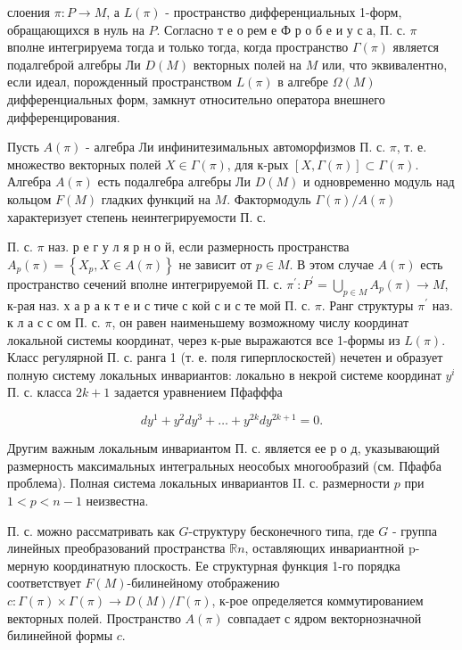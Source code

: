 \documentclass[10pt]{article}
\begin{document}
слоения $\pi: P \rightarrow M$, а $L(\pi)$ - пространство дифференциальных 1-форм, обращающихся в нуль на $P$. Согласно т е о рем е Ф р о б е и у с а, П. с. $\pi$ вполне интегрируема тогда и только тогда, когда пространство $\Gamma(\pi)$ является подалгеброй алгебры Ли $D(M)$ векторных полей на $M$ или, что эквивалентно, если идеал, порожденный пространством $L(\pi)$ в алгебре $\Omega(M)$ дифференциальных форм, замкнут относительно оператора внешнего дифференцирования.



Пусть $A(\pi)$ - алгебра Ли инфинитезимальных автоморфизмов П. с. $\pi$, т. е. множество векторных полей $X \in \Gamma(\pi)$, для к-рых $[X, \Gamma(\pi)] \subset \Gamma(\pi)$. Алгебра $A(\pi)$ есть подалгебра алгебры Ли $D(M)$ и одновременно модуль над кольцом $F(M)$ гладких функций на $M$. Фактормодуль $\Gamma(\pi) / A(\pi)$ характеризует степень неинтегрируемости П. с.



П. с. $\pi$ наз. р е г у л я р н о й, если размерность пространства $A_{p}(\pi)=\left\{X_{p}, X \in A(\pi)\right\}$ не зависит от $p \in M$. В этом случае $A(\pi)$ есть пространство сечений вполне интегрируемой П. с. $\pi^{\prime}: P^{\prime}=\bigcup_{p \in M} A_{p}(\pi) \rightarrow M$, к-рая наз. х а р а к т е и с тиче с кой с и с те мой П. с. $\pi$. Ранг структуры $\pi^{\prime}$ наз. к л а с с ом П. с. $\pi$, он равен наименьшему возможному числу координат локальной системы координат, через к-рые выражаются все 1-формы из $L(\pi)$. Класс регулярной П. с. ранга 1 (т. е. поля гиперплоскостей) нечетен и образует полную систему локальных инвариантов: локально в некрой системе координат $y^{i}$ П. с. класса $2 k+1$ задается уравнением Пфафффа



\[

d y^{1}+y^{2} d y^{3}+\ldots+y^{2 k} d y^{2 k+1}=0 .

\]



Другим важным локальным инвариантом П. с. является ее р о д, указывающий размерность максимальных интегральных неособых многообразий (см. Пфафба проблема). Полная система локальных инвариантов II. с. размерности $p$ при $1<p<n-1$ неизвестна.



П. с. можно рассматривать как $G$-структуру бесконечного типа, где $G$ - группа линейных преобразований пространства $\mathbb{R} n$, оставляющих инвариантной p-мерную координатную плоскость. Ее структурная функция 1-го порядка соответствует $F(M)$-билинейному отображению $c: \Gamma(\pi) \times \Gamma(\pi) \rightarrow D(M) / \Gamma(\pi)$, к-рое определяется коммутированием векторных полей. Пространство $A(\pi)$ совпадает с ядром векторнозначной билинейной формы $c$.
\end{document}
